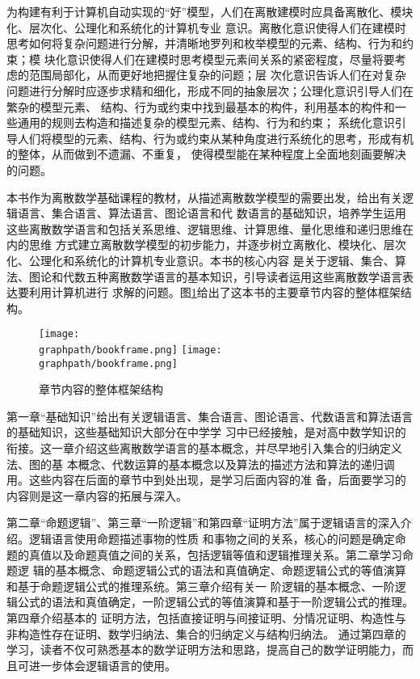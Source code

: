 为构建有利于计算机自动实现的“好”模型，人们在离散建模时应具备离散化、模块化、层次化、公理化和系统化的计算机专业
意识。离散化意识使得人们在建模时思考如何将复杂问题进行分解，并清晰地罗列和枚举模型的元素、结构、行为和约束；模
块化意识使得人们在建模时思考模型元素间关系的紧密程度，尽量将要考虑的范围局部化，从而更好地把握住复杂的问题；层
次化意识告诉人们在对复杂问题进行分解时应逐步求精和细化，形成不同的抽象层次；公理化意识引导人们在繁杂的模型元素、
结构、行为或约束中找到最基本的构件，利用基本的构件和一些通用的规则去构造和描述复杂的模型元素、结构、行为和约束；
系统化意识引导人们将模型的元素、结构、行为或约束从某种角度进行系统化的思考，形成有机的整体，从而做到不遗漏、不重复，
使得模型能在某种程度上全面地刻画要解决的问题。

本书作为离散数学基础课程的教材，从描述离散数学模型的需要出发，给出有关逻辑语言、集合语言、算法语言、图论语言和代
数语言的基础知识，培养学生运用这些离散数学语言和包括关系思维、逻辑思维、计算思维、量化思维和递归思维在内的思维
方式建立离散数学模型的初步能力，并逐步树立离散化、模块化、层次化、公理化和系统化的计算机专业意识。本书的核心内容
是关于逻辑、集合、算法、图论和代数五种离散数学语言的基本知识，引导读者运用这些离散数学语言表达要利用计算机进行
求解的问题。图\ref{figure:preface:book:frame}给出了这本书的主要章节内容的整体框架结构。
\begin{figure}[htbp]
\ifpdf \centering\texttt{[image: \\graphpath/bookframe.png]} \else
\centering\texttt{[image: \\graphpath/bookframe.png]} \fi
\caption{章节内容的整体框架结构}\label{figure:preface:book:frame}\vspace*{-0.8em}
\end{figure}

第一章“基础知识”给出有关逻辑语言、集合语言、图论语言、代数语言和算法语言的基础知识，这些基础知识大部分在中学学
习中已经接触，是对高中数学知识的衔接。这一章介绍这些离散数学语言的基本概念，并尽早地引入集合的归纳定义法、图的基
本概念、代数运算的基本概念以及算法的描述方法和算法的递归调用。这些内容在后面的章节中到处出现，是学习后面内容的准
备，后面要学习的内容则是这一章内容的拓展与深入。

第二章“命题逻辑”、第三章“一阶逻辑”和第四章“证明方法”属于逻辑语言的深入介绍。逻辑语言使用命题描述事物的性质
和事物之间的关系，核心的问题是确定命题的真值以及命题真值之间的关系，包括逻辑等值和逻辑推理关系。第二章学习命题逻
辑的基本概念、命题逻辑公式的语法和真值确定、命题逻辑公式的等值演算和基于命题逻辑公式的推理系统。第三章介绍有关一
阶逻辑的基本概念、一阶逻辑公式的语法和真值确定，一阶逻辑公式的等值演算和基于一阶逻辑公式的推理。第四章介绍基本的
证明方法，包括直接证明与间接证明、分情况证明、构造性与非构造性存在证明、数学归纳法、集合的归纳定义与结构归纳法。
通过第四章的学习，读者不仅可熟悉基本的数学证明方法和思路，提高自己的数学证明能力，而且可进一步体会逻辑语言的使用。

